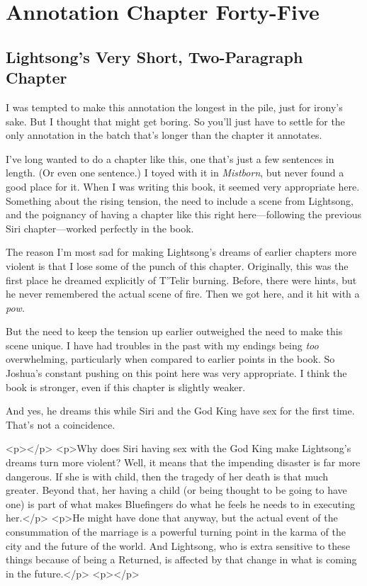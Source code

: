 \section{Annotation Chapter Forty-Five}

\subsection*{Lightsong’s Very Short, Two-Paragraph Chapter}

I was tempted to make this annotation the longest in the pile, just for irony’s sake. But I thought that might get boring. So you’ll just have to settle for the only annotation in the batch that’s longer than the chapter it annotates.

I’ve long wanted to do a chapter like this, one that’s just a few sentences in length. (Or even one sentence.) I toyed with it in \textit{Mistborn}, but never found a good place for it. When I was writing this book, it seemed very appropriate here. Something about the rising tension, the need to include a scene from Lightsong, and the poignancy of having a chapter like this right here—following the previous Siri chapter—worked perfectly in the book.

The reason I’m most sad for making Lightsong’s dreams of earlier chapters more violent is that I lose some of the punch of this chapter. Originally, this was the first place he dreamed explicitly of T’Telir burning. Before, there were hints, but he never remembered the actual scene of fire. Then we got here, and it hit with a \textit{pow}.

But the need to keep the tension up earlier outweighed the need to make this scene unique. I have had troubles in the past with my endings being \textit{too} overwhelming, particularly when compared to earlier points in the book. So Joshua’s constant pushing on this point here was very appropriate. I think the book is stronger, even if this chapter is slightly weaker.

And yes, he dreams this while Siri and the God King have sex for the first time. That’s not a coincidence.



<p></p>
<p>Why does Siri having sex with the God King make Lightsong’s dreams turn more violent? Well, it means that the impending disaster is far more dangerous. If she is with child, then the tragedy of her death is that much greater. Beyond that, her having a child (or being thought to be going to have one) is part of what makes Bluefingers do what he feels he needs to in executing her.</p>
<p>He might have done that anyway, but the actual event of the consummation of the marriage is a powerful turning point in the karma of the city and the future of the world. And Lightsong, who is extra sensitive to these things because of being a Returned, is affected by that change in what is coming in the future.</p>
<p></p>



